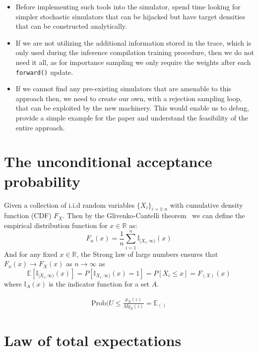 \documentclass{article}
\begin{document}
\begin{itemize}
\item Before implementing such tools into the simulator, spend time looking for simpler stochastic simulators 
that can be hijacked but have target densities that can be constructed analytically. 
\item If we are not utilizing the additional information stored in the trace, which is only used during the inference compilation
training procedure, then we do not need it all, as for importance sampling we only require the weights after each \texttt{forward()}
update. 
\item If we cannot find any pre-existing simulators that are amenable to this approach then, we need to create our own, with
a rejection sampling loop, that can be exploited by the new machinery. This would enable us to debug, provide a simple example 
for the paper and understand the feasibility of the entire approach. 
\end{itemize}



\appendix

\section{The unconditional acceptance probability}

Given a collection of i.i.d random variables $\{X_{i}\}_{i = 1:n}$ with 
cumulative density function (CDF) $F_{X}$. Then by the Glivenko-Cantelli theorem~\cite{tucker1959generalization} 
we can define the empirical distribution function for $x \in \mathbb{R}$ as:
\begin{equation}
  F_{n}(x) = \frac{1}{n}\sum^{n}_{i=1} \mathbb{I}_{[X_{i}, \infty)}(x)
\end{equation}
And for any fixed $x \in \mathbb{R}$, the Strong law of large numbers ensures that 
$F_{n}(x) \rightarrow F_{X}(x)$ as $n \rightarrow \infty$ as 
\begin{equation}
\mathbb{E}[\mathbb{I}_{[X_{i},\infty)}(x)] = 
 P[\mathbb{I}_{X_{i},\infty)}(x) = 1] = P[X_{i}\leq x] = F_(X)(x)
\end{equation}
where $\mathbb{I}_{A}(x)$  is the indicator function for a set $A$. 

\begin{align}
  \text{Prob}(U \leq \frac{p_{X}(z)}{Mg_{Z}(z)} = \mathbb{E}_()
\end{align}
\section{Law of total expectations}
\end{document}
